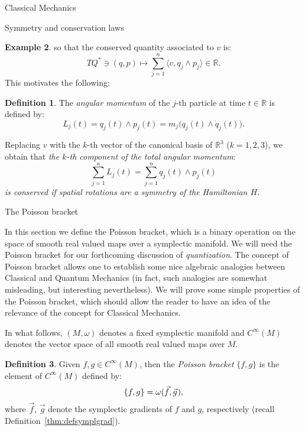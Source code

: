 \documentclass[oneside,a4paper,11pt]{amsbook}
\newcommand{\R}{\mathds R}
\newcommand{\microspace}{\mskip1mu}
\theoremstyle{remark}\newtheorem{exercise}{Exercise}[chapter]
\theoremstyle{plain}\newtheorem{teo}{Theorem}[section]
\theoremstyle{plain}\newtheorem{lem}[teo]{Lemma}
\theoremstyle{plain}\newtheorem{prop}[teo]{Proposition}
\theoremstyle{plain}\newtheorem{cor}[teo]{Corollary}
\theoremstyle{definition}\newtheorem{defin}[teo]{Definition}
\theoremstyle{remark}\newtheorem{rem}[teo]{Remark}
\theoremstyle{definition}\newtheorem{notation}[teo]{Notation}
\theoremstyle{definition}\newtheorem{convention}[teo]{Convention}
\theoremstyle{definition}\newtheorem{example}[teo]{Example}
\numberwithin{section}{chapter}
\numberwithin{equation}{section}
\begin{document}
\begin{chapter}{Classical Mechanics}
\begin{section}{Symmetry and conservation laws}
\begin{example}
so that the conserved quantity associated to $v$ is:
\begin{equation}\label{eq:angmom}
TQ^*\ni(q,p)\longmapsto\sum_{j=1}^n\langle v,q_j\wedge p_j\rangle\in\R.
\end{equation}
This motivates the following:
\begin{defin}
The {\em angular momentum\/} of the $j$-th particle at time $t\in\R$ is defined by:
\[L_j(t)=q_j(t)\wedge p_j(t)=m_j\big(q_j(t)\wedge\dot q_j(t)\big).\]
\end{defin}
Replacing $v$ with the $k$-th vector of the canonical basis of $\R^3$ ($k=1,2,3$), we obtain that {\em the $k$-th component of the total angular momentum}:
\[\sum_{j=1}^nL_j(t)=\sum_{j=1}^nq_j(t)\wedge p_j(t)\]
{\em is conserved if spatial rotations are a symmetry of the Hamiltonian $H$}.
\end{example}

\end{section}

\begin{section}{The Poisson bracket}

In this section we define the Poisson bracket, which is a binary operation on the space of smooth real valued
maps over a symplectic manifold. We will need the Poisson bracket for our forthcoming discussion of {\em quantization}.
The concept of Poisson bracket allows one to establish some nice algebraic analogies between Classical and Quantum
Mechanics (in fact, such analogies are somewhat misleading, but interesting nevertheless). We will
prove some simple properties of the Poisson bracket, which should allow the reader to have an idea of the relevance
of the concept for Classical Mechanics.

In what follows, $(M,\omega)$ denotes a fixed symplectic manifold and $C^\infty(M)$ denotes the vector space of all smooth real valued maps
over $M$.

\begin{defin}
Given $f,g\in C^\infty(M)$, then the {\em Poisson bracket\/} $\{f,g\}$ is the element of $C^\infty(M)$ defined by:
\[\{f,g\}=\omega(\vec f,\vec g\microspace),\]
where $\vec f$, $\vec g$ denote the symplectic gradients of $f$ and $g$, respectively (recall Definition~\ref{thm:defsymplgrad}).
\end{defin}


\end{section}
\end{chapter}
\end{document}
